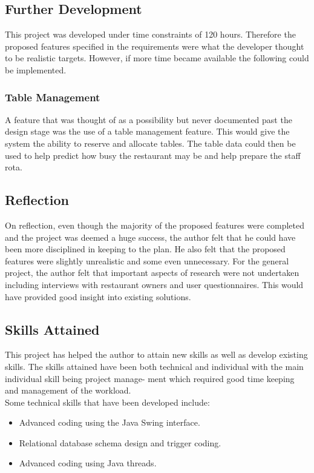 \documentclass[12pt,a4paper]{article}
\newcommand\tab[1][1cm]{\hspace*{#1}}
\begin{document}
	\subsection{Further Development}
	\tab This project was developed under time constraints of 120 hours. Therefore the proposed features
specified in the requirements were what the developer thought to be realistic targets.
However, if more time became available the following could be implemented.
	\subsubsection{Table Management}
	\tab A feature that was thought of as a possibility but never documented past the design stage was the use
of a table management feature. This would give the system the ability to reserve and allocate tables.
The table data could then be used to help predict how busy the restaurant may be and help prepare
the staff rota.
	\subsection{Reflection}
	\tab On reflection, even though the majority of the proposed features were completed and the project was
deemed a huge success, the author felt that he could have been more disciplined in keeping to the plan.
He also felt that the proposed features were slightly unrealistic and some even unnecessary.
For the general project, the author felt that important aspects of research were not undertaken
including interviews with restaurant owners and user questionnaires. This would have provided good
insight into existing solutions.
	\newpage
	\subsection{Skills Attained}
	\tab This project has helped the author to attain new skills as well as develop existing skills. The skills
attained have been both technical and individual with the main individual skill being project manage-
ment which required good time keeping and management of the workload. \\
Some technical skills that
have been developed include:
	\begin{itemize}
		\item Advanced coding using the Java Swing interface.
		\item Relational database schema design and trigger coding.
		\item Advanced coding using Java threads.
	\end{itemize}
\end{document}
